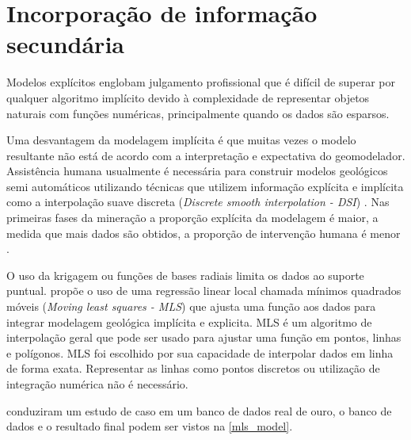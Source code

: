 \section{Incorporação de informação secundária}

Modelos explícitos englobam julgamento profissional que é difícil de superar por qualquer
algoritmo implícito devido à complexidade de representar objetos naturais com funções numéricas, principalmente quando os dados são esparsos. 

Uma desvantagem da modelagem implícita é que muitas vezes o modelo resultante não está de acordo com a interpretação e expectativa do geomodelador. Assistência humana usualmente é necessária para construir modelos geológicos semi automáticos utilizando técnicas que utilizem informação explícita e implícita  como a interpolação suave discreta (\textit{Discrete smooth interpolation - DSI}) \cite{malletgeomodeling}. Nas primeiras fases da mineração a proporção explícita da modelagem é maior, a medida que mais dados são obtidos, a proporção de intervenção humana é menor \cite{manchuck_MLS}.

O uso da krigagem ou funções de bases radiais limita os dados ao suporte puntual.  propõe o uso de uma regressão linear local chamada mínimos quadrados móveis (\textit{Moving least squares - MLS}) que ajusta uma função aos dados para integrar modelagem geológica implícita e explicita. MLS é um algoritmo de interpolação geral que pode ser usado para ajustar uma função em pontos, linhas e polígonos. 
MLS foi escolhido por sua capacidade de interpolar dados em linha de forma exata. Representar as linhas como pontos discretos ou utilização de integração numérica não é necessário. 

 conduziram um estudo de caso em um banco de dados real de ouro, o banco de dados e o resultado final podem ser vistos na \autoref{mls_model}.

